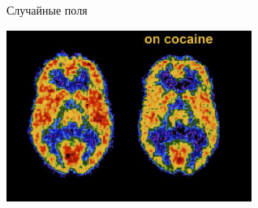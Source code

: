 \documentclass[9pt,pdf,utf8,hyperref={unicode},aspectratio=169]{beamer}
\begin{document}
\begin{frame}{Случайные поля}

    \begin{center}
        \includegraphics[width=0.6\textwidth]{cocaine.png}
    \end{center}
	
\end{frame}
\end{document}
